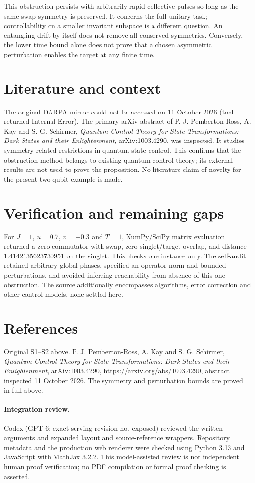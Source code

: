\documentclass[11pt]{article}
\begin{document}
This obstruction persists with arbitrarily rapid collective pulses so long as the same swap symmetry is preserved. It concerns the full unitary task; controllability on a smaller invariant subspace is a different question. An entangling drift by itself does not remove all conserved symmetries. Conversely, the lower time bound alone does not prove that a chosen asymmetric perturbation enables the target at any finite time.

\section{Literature and context}
The original DARPA mirror could not be accessed on 11 October 2026 (tool returned Internal Error). The primary arXiv abstract of P. J. Pemberton-Ross, A. Kay and S. G. Schirmer, \emph{Quantum Control Theory for State Transformations: Dark States and their Enlightenment}, arXiv:1003.4290, was inspected. It studies symmetry-related restrictions in quantum state control. This confirms that the obstruction method belongs to existing quantum-control theory; its external results are not used to prove the proposition. No literature claim of novelty for the present two-qubit example is made.

\section{Verification and remaining gaps}
For $J=1$, $u=0.7$, $v=-0.3$ and $T=1$, NumPy/SciPy matrix evaluation returned a zero commutator with swap, zero singlet/target overlap, and distance $1.4142135623730951$ on the singlet. This checks one instance only. The self-audit retained arbitrary global phases, specified an operator norm and bounded perturbations, and avoided inferring reachability from absence of this one obstruction. The source additionally encompasses algorithms, error correction and other control models, none settled here.

\section{References}
Original S1--S2 above. P. J. Pemberton-Ross, A. Kay and S. G. Schirmer, \emph{Quantum Control Theory for State Transformations: Dark States and their Enlightenment}, arXiv:1003.4290, \url{https://arxiv.org/abs/1003.4290}, abstract inspected 11 October 2026. The symmetry and perturbation bounds are proved in full above.


\paragraph{Integration review.} Codex (GPT-6; exact serving revision not exposed) reviewed the written arguments and expanded layout and source-reference wrappers. Repository metadata and the production web renderer were checked using Python 3.13 and JavaScript with MathJax 3.2.2. This model-assisted review is not independent human proof verification; no PDF compilation or formal proof checking is asserted.
\end{document}
